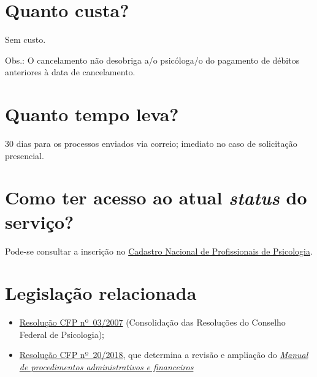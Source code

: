 \section{Quanto custa?}

Sem custo.

\noindent Obs.: O cancelamento não desobriga a/o psicóloga/o do pagamento de débitos anteriores à data de cancelamento.

\section{Quanto tempo leva?}

30 dias para os processos enviados via correio; imediato no caso de solicitação presencial.

\section{Como ter acesso ao atual \emph{status} do serviço?}

Pode-se consultar a inscrição no \href{https://cadastro.cfp.org.br/}{Cadastro Nacional de Profissionais de Psicologia}.

\section{Legislação relacionada}

\begin{itemize}
  \item  \href{https://atosoficiais.com.br/cfp/resolucao-administrativa-financeira-n-3-2007-institui-a-consolidacao-das-resolucoes-do-conselho-federal-de-psicologia?origin=instituicao&q=resolu\%C3\%A7\%C3\%A3o\%203/2007}{Resolução  CFP nº~03/2007} (Consolidação das Resoluções do Conselho Federal de  Psicologia);
  \item  \href{https://transparencia.cfp.org.br/wp-content/uploads/sites/7/2020/05/Manual-de-Procedimentos-Administrativos-e-Financeiro-CFP-RES-20.2018.pdf}{\href{https://atosoficiais.com.br/cfp/resolucao-administrativa-financeira-n-20-2018-altera-o-manual-de-procedimentos-administrativo-e-financeiro-do-sistema-conselhos-de-psicologia-anexo-da-resolucao-cfp-n-202018-a-resolucao-cfp-n-03-2007-a-resolucao-cfp-n-16-2019-e-da-outras-providencias}{Resolução  CFP nº~20/2018}}, que determina a revisão e ampliação do  \href{https://transparencia.cfp.org.br/wp-content/uploads/sites/7/2020/05/Manual-de-Procedimentos-Administrativos-e-Financeiro-CFP-RES-20.2018.pdf}{\emph{Manual  de procedimentos administrativos e financeiros}}
\end{itemize}

\sumario
